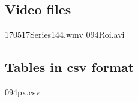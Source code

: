 \documentclass{biophys-new}
\begin{document}
\subsection*{Video files}

170517Series144.wmv
094Roi.avi

\subsection*{Tables in csv format}

094px.csv

\end{document}
